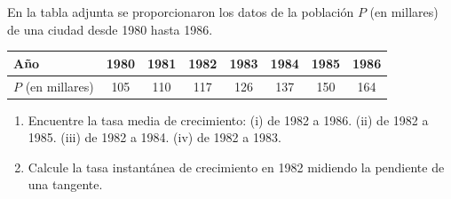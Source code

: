 \item En la tabla adjunta se proporcionaron los datos de la población $P$ (en millares) de una ciudad desde 1980 hasta 1986.
    
    \begin{center}
    \begin{tabular}{|l|c|c|c|c|c|c|c|}
    \hline
    Año & 1980 & 1981 & 1982 & 1983 & 1984 & 1985 & 1986 \\
    \hline
    $P$ (en millares) & 105 & 110 & 117 & 126 & 137 & 150 & 164 \\
    \hline
    \end{tabular}
    \end{center}
    
    \begin{enumerate}
        \item Encuentre la tasa media de crecimiento:
        (i) de 1982 a 1986. \quad (ii) de 1982 a 1985. \quad (iii) de 1982 a 1984. \quad (iv) de 1982 a 1983.
        \item Calcule la tasa instantánea de crecimiento en 1982 midiendo la pendiente de una tangente.
    \end{enumerate}
